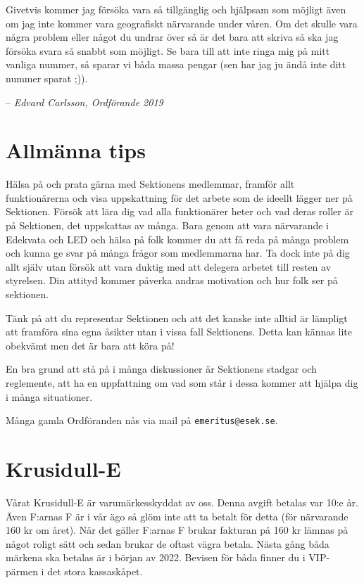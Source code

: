 \documentclass[10pt]{article}
\begin{document}
    Givetvis kommer jag försöka vara så tillgänglig och hjälpsam som möjligt även om jag inte kommer vara geografiskt närvarande under våren. Om det skulle vara några problem eller något du undrar över så är det bara att skriva så ska jag försöka svara så snabbt som möjligt. Se bara till att inte ringa mig på mitt vanliga nummer, så sparar vi båda massa pengar (sen har jag ju ändå inte ditt nummer sparat ;)).

    -- \emph{Edvard Carlsson, Ordförande 2019}
    
    \section{Allmänna tips}
    
    Hälsa på och prata gärna med Sektionens medlemmar, framför allt funktionärerna och visa uppskattning för det arbete som de ideellt lägger ner på Sektionen. Försök att lära dig vad alla funktionärer heter och vad deras roller är på Sektionen, det uppskattas av många. Bara genom att vara närvarande i Edekvata och LED och hälsa på folk kommer du att få reda på många problem och kunna ge svar på många frågor som medlemmarna har. Ta dock inte på dig allt själv utan försök att vara duktig med att delegera arbetet till resten av styrelsen. Din attityd kommer påverka andras motivation och hur folk ser på sektionen. 
    
    Tänk på att du representar Sektionen och att det kanske inte alltid är lämpligt att framföra sina egna åsikter utan i vissa fall Sektionens. Detta kan kännas lite obekvämt men det är bara att köra på!
    
    En bra grund att stå på i många diskussioner är Sektionens stadgar och reglemente, att ha en uppfattning om vad som står i dessa kommer att hjälpa dig i många situationer.
    
    Många gamla Ordföranden nås via mail på \texttt{emeritus@esek.se}.
    
    \section{Krusidull-E}
    
    Vårat Krusidull-E är varumärkesskyddat av oss. Denna avgift betalas var 10:e år. Även F:arnas F är i vår ägo så glöm inte att ta betalt för detta (för närvarande 160 kr om året). När det gäller F:arnas F brukar fakturan på 160 kr lämnas på något roligt sätt och sedan brukar de oftast vägra betala. Nästa gång båda märkena ska betalas är i början av 2022. Bevisen för båda finner du i VIP-pärmen i det stora kassaskåpet.
    
\end{document}
